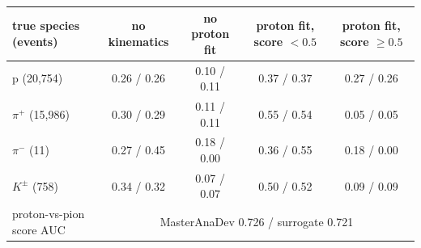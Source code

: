 \begin{tabular}{lcccc}
\toprule
true species (events) & no kinematics & no proton fit & proton fit, score $<0.5$ & proton fit, score $\geq 0.5$ \\
\midrule
p (20,754) & 0.26 / 0.26 & 0.10 / 0.11 & 0.37 / 0.37 & 0.27 / 0.26 \\
$\pi^+$ (15,986) & 0.30 / 0.29 & 0.11 / 0.11 & 0.55 / 0.54 & 0.05 / 0.05 \\
$\pi^-$ (11) & 0.27 / 0.45 & 0.18 / 0.00 & 0.36 / 0.55 & 0.18 / 0.00 \\
$K^\pm$ (758) & 0.34 / 0.32 & 0.07 / 0.07 & 0.50 / 0.52 & 0.09 / 0.09 \\
\midrule
proton-vs-pion score AUC & \multicolumn{4}{c}{MasterAnaDev 0.726 / surrogate 0.721} \\
\bottomrule
\end{tabular}
